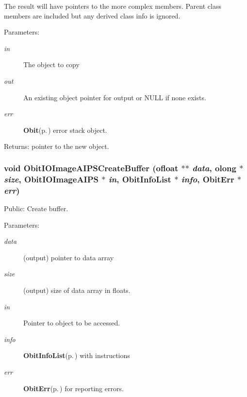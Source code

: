 The result will have pointers to the more complex members. Parent class members are included but any derived class info is ignored. \begin{Desc}
\item[Parameters:]
\begin{description}
\item[{\em in}]The object to copy \item[{\em out}]An existing object pointer for output or NULL if none exists. \item[{\em err}]{\bf Obit}{\rm (p.\,\pageref{structObit})} error stack object. \end{description}
\end{Desc}
\begin{Desc}
\item[Returns:]pointer to the new object. \end{Desc}
\subsubsection{\setlength{\rightskip}{0pt plus 5cm}void Obit\-IOImage\-AIPSCreate\-Buffer ({\bf ofloat} $\ast$$\ast$ {\em data}, {\bf olong} $\ast$ {\em size}, {\bf Obit\-IOImage\-AIPS} $\ast$ {\em in}, {\bf Obit\-Info\-List} $\ast$ {\em info}, {\bf Obit\-Err} $\ast$ {\em err})}\label{ObitIOImageAIPS_8c_a20}


Public: Create buffer. 

\begin{Desc}
\item[Parameters:]
\begin{description}
\item[{\em data}](output) pointer to data array \item[{\em size}](output) size of data array in floats. \item[{\em in}]Pointer to object to be accessed. \item[{\em info}]{\bf Obit\-Info\-List}{\rm (p.\,\pageref{structObitInfoList})} with instructions \item[{\em err}]{\bf Obit\-Err}{\rm (p.\,\pageref{structObitErr})} for reporting errors. \end{description}
\end{Desc}
